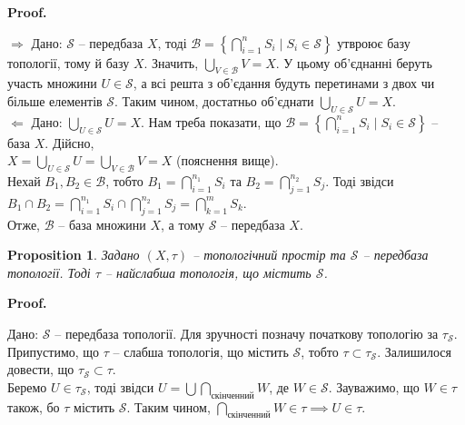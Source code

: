 \documentclass[a4paper, 10pt]{article}
\makeatletter
\def\rightproof{$\boxed{\Rightarrow}$ }
\def\leftproof{$\boxed{\Leftarrow}$ }
\theoremstyle{theoremdd}
\newtheorem{example}[theorem]{Example}
\newtheorem{proposition}[theorem]{Proposition}
\renewenvironment{proof}[1][Proof.\\]{\par
\pushQED{\hfill \qed}%
\normalfont \topsep6\p@\@plus6\p@\relax
\trivlist
\item\relax
{\bfseries
#1\@addpunct{.}}\hspace\labelsep\ignorespaces
}{%
\popQED\endtrivlist\@endpefalse
}
\makeatother
\begin{document}
\begin{proof}
\rightproof Дано: $\mathcal{S}$ -- передбаза $X$, тоді $\mathcal{B} = \displaystyle\left\{ \bigcap_{i=1}^n S_i \mid S_i \in \mathcal{S} \right\}$ утвроює базу топології, тому й базу $X$. Значить, $\displaystyle\bigcup_{V \in \mathcal{B}} V = X$. У цьому об'єднанні беруть участь множини $U \in \mathcal{S}$, а всі решта з об'єдання будуть перетинами з двох чи більше елементів $\mathcal{S}$. Таким чином, достатньо об'єднати $\displaystyle\bigcup_{U \in \mathcal{S}} U = X$.
\bigskip \\
\leftproof Дано: $\displaystyle\bigcup_{U \in \mathcal{S}} U = X$. Нам треба показати, що $\mathcal{B} = \displaystyle\left\{ \bigcap_{i=1}^n S_i \mid S_i \in \mathcal{S} \right\}$ -- база $X$. Дійсно,\\
$X = \displaystyle\bigcup_{U \in \mathcal{S}} U = \bigcup_{V \in \mathcal{B}} V = X$ (пояснення вище).\\
Нехай $B_1,B_2 \in \mathcal{B}$, тобто $\displaystyle B_1 = \bigcap_{i=1}^{n_1} S_i$ та $\displaystyle B_2 = \bigcap_{j=1}^{n_2} S_j$. Тоді звідси $B_1 \cap B_2 = \displaystyle\bigcap_{i=1}^{n_1} S_i \cap \bigcap_{j=1}^{n_2} S_j = \bigcap_{k=1}^{m} S_k$.\\
Отже, $\mathcal{B}$ -- база множини $X$, а тому $\mathcal{S}$ -- передбаза $X$.
\end{proof}

\begin{proposition}
Задано $(X,\tau)$ -- топологічний простір та $\mathcal{S}$ -- передбаза топології. Тоді $\tau$ -- найслабша топологія, що містить $\mathcal{S}$.
\end{proposition}

\begin{proof}
Дано: $\mathcal{S}$ -- передбаза топології. Для зручності позначу початкову топологію за $\tau_{\mathcal{S}}$.\\
Припустимо, що $\tau$ -- слабша топологія, що містить $\mathcal{S}$, тобто $\tau \subset \tau_{\mathcal{S}}$. Залишилося довести, що $\tau_{\mathcal{S}} \subset \tau$.\\
Беремо $U \in \tau_{\mathcal{S}}$, тоді звідси $U = \displaystyle\bigcup \bigcap_{\text{скінченний}} W$, де $W \in \mathcal{S}$. Зауважимо, що $W \in \tau$ також, бо $\tau$ містить $\mathcal{S}$. Таким чином, $\displaystyle\bigcap_{\text{скінченний}} W \in \tau \implies U \in \tau$.
\end{proof}

\iffalse
\begin{example}
Зокрема $\mathcal{S} = \{(-\infty,b), (a,+\infty) \mid a,b \in \mathbb{R}\}$ буде передбазою $\mathbb{R}$, причому породжена топологія повністю збігатиметься зі стандартною.\\
Те, що це передбаза, -- цілком зрозуміло, якщо об'єднати всі інтервали. Залишилося довести, що $\tau_{\mathcal{S}} = \tau_{\text{stand}}$.\\
Цілком зрозуміло, що $\tau_{\mathcal{S}} \subset \tau_{\text{stand}}$. Тепер нехай $U \in \tau_{\text{stand}}$. Ми знаємо, що $\tau_{\text{stand}} = \tau_{\mathcal{B}}$, причому $\mathcal{B} = \{(a,b) \mid a,b \in \mathbb{Q}\}$
\end{example}
\fi
\end{document}
